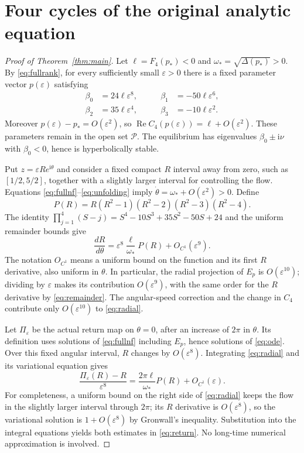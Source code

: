 \documentclass[11pt,a4paper]{article}
\theoremstyle{remark}
\newcommand{\ii}{\mathrm i}
\newcommand{\Rea}{\operatorname{Re}}
\newcommand{\eps}{\varepsilon}
\numberwithin{equation}{section}
\begin{document}
\section{Four cycles of the original analytic equation}\label{sec:cycles}
\begin{proof}[Proof of Theorem~\ref{thm:main}]
Let $\ell=F_4(p_*)<0$ and $\omega_*=\sqrt{\Delta(p_*)}>0$.
By \eqref{eq:fullrank}, for every sufficiently small $\eps>0$ there
is a fixed parameter vector $p(\eps)$ satisfying
\begin{equation}\label{eq:unfolding}
 \begin{aligned}
 \beta_0&=24\ell\eps^8,&\qquad \beta_1&=-50\ell\eps^6,\\
 \beta_2&=35\ell\eps^4,&\qquad \beta_3&=-10\ell\eps^2.
 \end{aligned}
\end{equation}
Moreover $p(\eps)-p_*=O(\eps^2)$, so
$\Rea C_4(p(\eps))=\ell+O(\eps^2)$. These parameters remain in
the open set $\mathcal P$. The equilibrium has eigenvalues
$\beta_0\pm\ii\nu$ with $\beta_0<0$, hence is hyperbolically stable.

Put $z=\eps R e^{\ii\theta}$ and consider a fixed compact $R$
interval away from zero, such as $[1/2,5/2]$, together with a slightly
larger interval for controlling the flow. Equations
\eqref{eq:fullnf}--\eqref{eq:unfolding} imply
$\dot\theta=\omega_*+O(\eps^2)>0$. Define
\begin{equation}\label{eq:polynomial}
 P(R)=R(R^2-1)(R^2-2)(R^2-3)(R^2-4).
\end{equation}
The identity
$\prod_{j=1}^4(S-j)=S^4-10S^3+35S^2-50S+24$ and the uniform
remainder bounds give
\begin{equation}\label{eq:radial}
 \frac{dR}{d\theta}
       =\eps^8\frac{\ell}{\omega_*}P(R)+O_{C^1}(\eps^9).
\end{equation}
The notation $O_{C^1}$ means a uniform bound on the function and
its first $R$ derivative, also uniform in $\theta$. In particular,
the radial projection of $E_p$ is $O(\eps^{10})$; dividing by
$\eps$ makes its contribution $O(\eps^9)$, with the same order
for the $R$ derivative by \eqref{eq:remainder}. The angular-speed
correction and the change in $C_4$ contribute only $O(\eps^{10})$
to \eqref{eq:radial}.

Let $\Pi_\eps$ be the actual return map on $\theta=0$, after an
increase of $2\pi$ in $\theta$. Its definition uses solutions of
\eqref{eq:fullnf} including $E_p$, hence solutions of
\eqref{eq:ode}. Over this fixed angular interval, $R$ changes by
$O(\eps^8)$. Integrating \eqref{eq:radial} and its variational
equation gives
\begin{equation}\label{eq:return}
 \frac{\Pi_\eps(R)-R}{\eps^8}
       =\frac{2\pi\ell}{\omega_*}P(R)+O_{C^1}(\eps).
\end{equation}
For completeness, a uniform bound on the right side of
\eqref{eq:radial} keeps the flow in the slightly larger interval
through $2\pi$; its $R$ derivative is $O(\eps^8)$, so the
variational solution is $1+O(\eps^8)$ by Gronwall's inequality.
Substitution into the integral equations yields both estimates in
\eqref{eq:return}. No long-time numerical approximation is involved.


\end{proof}
\end{document}
